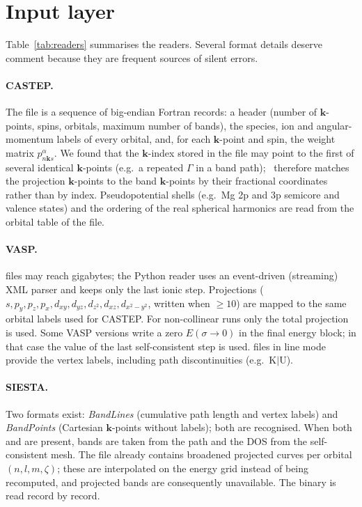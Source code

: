 \section{Input layer}\label{sec:input}
Table~\ref{tab:readers} summarises the readers. Several format details deserve comment because they are frequent sources of silent errors.



\paragraph{CASTEP.} The  file is a sequence of big-endian Fortran records: a header (number of $\bm{k}$-points, spins, orbitals, maximum number of bands), the species, ion and angular-momentum labels of every orbital, and, for each $\bm{k}$-point and spin, the weight matrix $p^{\alpha}_{n\bm{k} s}$. We found that the $\bm{k}$-index stored in the file may point to the first of several identical $\bm{k}$-points (e.g.\ a repeated $\Gamma$ in a band path); \BMR\ therefore matches the projection $\bm{k}$-points to the band $\bm{k}$-points by their fractional coordinates rather than by index. Pseudopotential shells (e.g.\ Mg 2p and 3p semicore and valence states) and the ordering of the real spherical harmonics are read from the orbital table of the  file.

\paragraph{VASP.}  files may reach gigabytes; the Python reader uses an event-driven (streaming) XML parser and keeps only the last ionic step. Projections ($s,p_y,p_z,p_x,d_{xy},d_{yz},d_{z^2},d_{xz},d_{x^2-y^2}$, written when $\geq10$) are mapped to the same orbital labels used for CASTEP. For non-collinear runs only the total projection is used. Some VASP versions write a zero $E(\sigma\!\to\!0)$ in the final energy block; in that case the value of the last self-consistent step is used.  files in line mode provide the vertex labels, including path discontinuities (e.g.\ K$|$U).

\paragraph{SIESTA.} Two  formats exist: \emph{BandLines} (cumulative path length and vertex labels) and \emph{BandPoints} (Cartesian $\bm{k}$-points without labels); both are recognised. When both  and  are present, bands are taken from the path and the DOS from the self-consistent mesh. The  file already contains broadened projected curves per orbital $(n,l,m,\zeta)$; these are interpolated on the energy grid instead of being recomputed, and projected bands are consequently unavailable. The binary  is read record by record.

